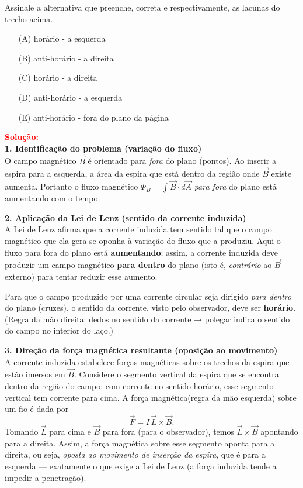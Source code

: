 \begin{flushleft}
Assinale a alternativa que preenche, correta e respectivamente, as lacunas do trecho acima.

\begin{itemize}
\item[(A)] horário - a esquerda
\item[(B)] anti-horário - a direita
\item[(C)] horário - a direita
\item[(D)] anti-horário - a esquerda
\item[(E)] anti-horário - fora do plano da página
\end{itemize}

\vspace{0.5cm}

\textcolor{red}{\textbf{Solução:}}\\

\textbf{1. Identificação do problema (variação do fluxo)}\\
O campo magnético $\vec{B}$ é orientado para \emph{fora} do plano (pontos). Ao inserir a espira para a esquerda, a área da espira 
que está dentro da região onde $\vec{B}$ existe aumenta. Portanto \colorbox{green!20}{o fluxo magnético $\Phi_B=\int \vec{B}\cdot d\vec{A}$ \emph{para fora}
do plano está aumentando com o tempo.}

\bigskip

\textbf{2. Aplicação da Lei de Lenz (sentido da corrente induzida)}\\
A Lei de Lenz afirma que a corrente induzida tem sentido tal que o campo magnético que ela gera se oponha à variação do fluxo que a produziu. Aqui o 
fluxo para fora do plano está \textbf{aumentando}; assim, a corrente induzida deve produzir um campo magnético \textbf{para dentro} \colorbox{green!30}{do plano 
(isto é, \emph{contrário} ao $\vec{B}$ externo) para tentar reduzir esse aumento.}

Para que o campo produzido por uma corrente circular seja dirigido \emph{para dentro} do plano (cruzes), o sentido da corrente, visto pelo observador, 
deve ser \textbf{horário}. (Regra da mão direita: dedos no sentido da corrente → polegar indica o sentido do campo no interior do laço.)

\bigskip

\textbf{3. Direção da força magnética resultante (oposição ao movimento)}\\
A corrente induzida estabelece forças magnéticas sobre os trechos da espira que estão imersos em $\vec{B}$. Considere o segmento vertical da espira que 
se encontra dentro da região do campo: com corrente no sentido horário, esse segmento vertical tem corrente para cima. \colorbox{green!30}{A força magnética(regra 
da m\~ao esquerda) sobre um fio} é dada por
\[
\vec{F}=I\,\vec{L}\times\vec{B}.
\]
Tomando $\vec{L}$ para cima e $\vec{B}$ para fora (para o observador), temos $\vec{L}\times\vec{B}$ apontando para a direita. 
Assim, a força magnética sobre esse segmento aponta para a direita, ou seja, \emph{oposta ao movimento de inserção da espira}, que 
é para a esquerda — exatamente o que exige a \colorbox{green!20}{Lei de Lenz (a força induzida tende a impedir a penetração).}


\end{flushleft}
